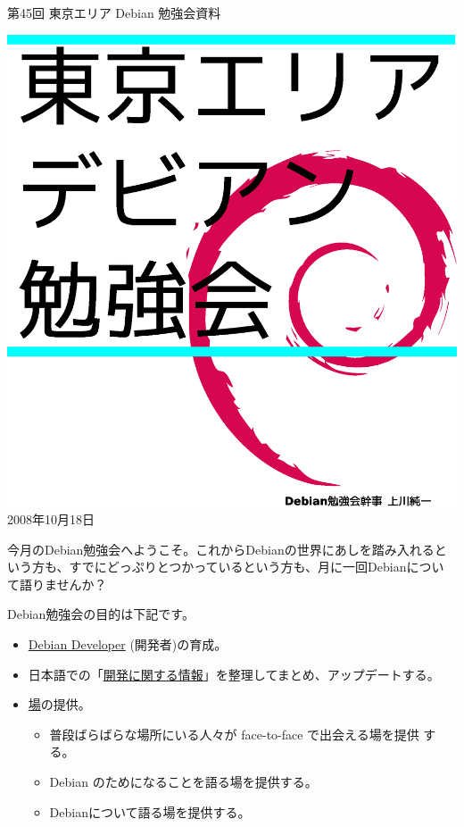 \documentclass[mingoth,a4paper]{jsarticle}
\newcommand{\debmtgyear}{2008}
\newcommand{\debmtgmonth}{10}
\newcommand{\debmtgdate}{18}
\newcommand{\debmtgnumber}{45}
\begin{document}
\begin{titlepage}
\thispagestyle{empty}


\vspace*{-2cm}
第\debmtgnumber{}回 東京エリア Debian 勉強会資料

\hspace*{-2.4cm}
\includegraphics[width=210mm]{image200801/2008title.eps}\\
\hfill{}\debmtgyear{}年\debmtgmonth{}月\debmtgdate{}日

\end{titlepage}

 
 今月のDebian勉強会へようこそ。これからDebianの世界にあしを踏み入れると
 いう方も、すでにどっぷりとつかっているという方も、月に一回Debianについ
 て語りませんか？

 Debian勉強会の目的は下記です。

\begin{itemize}
 \item \underline{Debian Developer} (開発者)の育成。
 \item 日本語での「\underline{開発に関する情報}」を整理してまとめ、アップデートする。
 \item \underline{場}の提供。
 \begin{itemize}
  \item 普段ばらばらな場所にいる人々が face-to-face で出会える場を提供
	する。
  \item Debian のためになることを語る場を提供する。
  \item Debianについて語る場を提供する。
 \end{itemize}
\end{itemize}		
\end{document}

